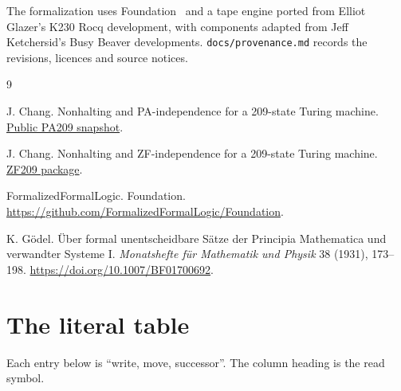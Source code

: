 \documentclass[11pt,letterpaper]{article}
\newcommand{\file}[1]{\texttt{\nolinkurl{#1}}}
\begin{document}
The formalization uses Foundation~\cite{foundation} and a tape engine
ported from Elliot Glazer's K230 Rocq development, with components adapted
from Jeff Ketchersid's Busy Beaver developments. \file{docs/provenance.md}
records the revisions, licences and source notices.

\begin{thebibliography}{9}

J. Chang.
Nonhalting and PA-independence for a 209-state Turing machine.
\href{https://github.com/jamesyc/BusyBeaver/tree/69d98241a721ead20b4f0b17df9062950b40fbfe}{Public PA209 snapshot}.

J. Chang.
Nonhalting and ZF-independence for a 209-state Turing machine.
\href{https://github.com/jamesyc/BusyBeaver/tree/286324f9ad106bbeab32b70404e7a82be2cd660d/ZF209}{ZF209 package}.

FormalizedFormalLogic.
Foundation.
\url{https://github.com/FormalizedFormalLogic/Foundation}.

K. G\"odel.
\"Uber formal unentscheidbare S\"atze der Principia Mathematica und
verwandter Systeme I.
\emph{Monatshefte f\"ur Mathematik und Physik} 38 (1931), 173--198.
\url{https://doi.org/10.1007/BF01700692}.

\end{thebibliography}

\appendix
\section{The literal table}\label{app:table}

Each entry below is ``write, move, successor''. The column heading is the
read symbol.


\end{document}
